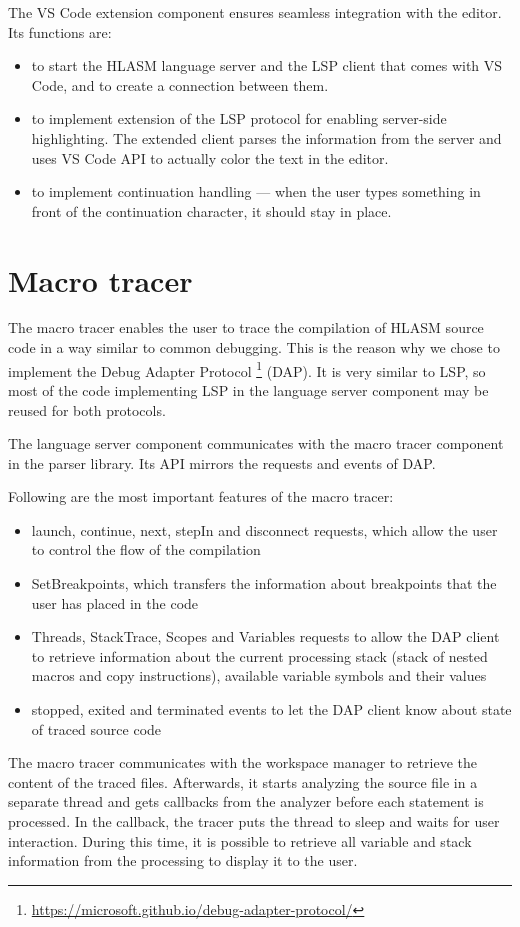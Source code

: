 The VS Code extension component ensures seamless integration with the editor. Its functions are:

\begin{itemize}
	\item to start the HLASM language server and the LSP client that comes with VS Code, and to create a connection between them.
	\item to implement extension of the LSP protocol for enabling server-side highlighting. The extended client parses the information from the server and uses VS Code API to actually color the text in the editor.
	\item to implement continuation handling --- when the user types something in front of the continuation character, it should stay in place.
\end{itemize}


\section{Macro tracer}
\label{arch:macro}
The macro tracer enables the user to trace the compilation of HLASM source code in a way similar to common debugging. This is the reason why we chose to implement the Debug Adapter Protocol \footnote{\url{https://microsoft.github.io/debug-adapter-protocol/}} (DAP). It is very similar to LSP, so most of the code implementing LSP in the language server component may be reused for both protocols.

The language server component communicates with the macro tracer component in the parser library. Its API mirrors the requests and events of DAP.

Following are the most important features of the macro tracer:

\begin{itemize}
	\item launch, continue, next, stepIn and disconnect requests, which allow the user to control the flow of the compilation
	\item SetBreakpoints, which transfers the information about breakpoints that the user has placed in the code
	\item Threads, StackTrace, Scopes and Variables requests to allow the DAP client to retrieve information about the current processing stack (stack of nested macros and copy instructions), available variable symbols and their values
	\item stopped, exited and terminated events to let the DAP client know about state of traced source code
\end{itemize}

The macro tracer communicates with the workspace manager to retrieve the content of the traced files. Afterwards, it starts analyzing the source file in a separate thread and gets callbacks from the analyzer before each statement is processed. In the callback, the tracer puts the thread to sleep and waits for user interaction. During this time, it is possible to retrieve all variable and stack information from the processing to display it to the user.
